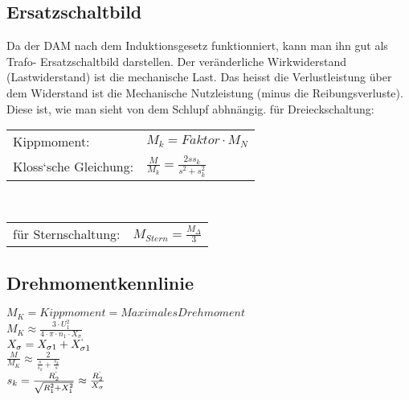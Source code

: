     \subsection{Ersatzschaltbild}
        Da der DAM nach dem Induktionsgesetz funktionniert, kann man ihn gut als Trafo- Ersatzschaltbild darstellen. Der veränderliche Wirkwiderstand (Lastwiderstand) ist die mechanische Last. Das heisst die Verlustleistung über dem Widerstand ist die Mechanische Nutzleistung (minus die Reibungsverluste). Diese ist, wie man sieht von dem Schlupf abhnängig.
        für Dreieckschaltung: \\
        \begin{tabular}{p{3cm} p{13cm}}
            Kippmoment: &
            $M_k= Faktor \cdot M_N$ \\
            Kloss`sche Gleichung: &
            $\frac{M}{M_k}=\frac{2 s s_k}{s^2+s_k^2} $ \\
        \end{tabular} \\
        \begin{tabular}{p{3cm} p{13cm}}
            für Sternschaltung: &
            $M_{Stern}= \frac{M_\Delta}{3}$
        \end{tabular}
       
    \subsection{Drehmomentkennlinie}
        \begin{minipage}{5cm}
        \end{minipage}
        \begin{minipage}{13cm}
            $M_K = Kippmoment = Maximales Drehmoment$ \\
            $M_K \approx \frac{3 \cdot U_1^2}{4\cdot \pi \cdot n_1 \cdot X_\sigma}$ \\
            $X_\sigma = X_{\sigma 1} + X_{\sigma 1}^`$ \\
            $\frac{M}{M_K}\approx \frac{2}{\frac{s}{s_k}+\frac{s_k}{s}}$ \\
            $s_k = \frac{R_2^`}{\sqrt{R_1^2 + X_1^2}} \approx \frac{R_2^`}{X_\sigma}$    
        \end{minipage}
        \newpage

